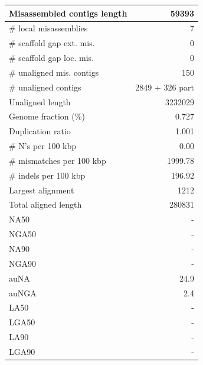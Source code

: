 \documentclass[12pt,a4paper]{article}
\begin{document}
\begin{table}[ht]
\begin{center}
\begin{tabular}{|l*{1}{|r}|}
Misassembled contigs length & 59393 \\ \hline
\# local misassemblies & 7 \\ \hline
\# scaffold gap ext. mis. & 0 \\ \hline
\# scaffold gap loc. mis. & 0 \\ \hline
\# unaligned mis. contigs & 150 \\ \hline
\# unaligned contigs & 2849 + 326 part \\ \hline
Unaligned length & 3232029 \\ \hline
Genome fraction (\%) & 0.727 \\ \hline
Duplication ratio & 1.001 \\ \hline
\# N's per 100 kbp & 0.00 \\ \hline
\# mismatches per 100 kbp & 1999.78 \\ \hline
\# indels per 100 kbp & 196.92 \\ \hline
Largest alignment & 1212 \\ \hline
Total aligned length & 280831 \\ \hline
NA50 & - \\ \hline
NGA50 & - \\ \hline
NA90 & - \\ \hline
NGA90 & - \\ \hline
auNA & 24.9 \\ \hline
auNGA & 2.4 \\ \hline
LA50 & - \\ \hline
LGA50 & - \\ \hline
LA90 & - \\ \hline
LGA90 & - \\ \hline
\end{tabular}
\end{center}
\end{table}
\end{document}
